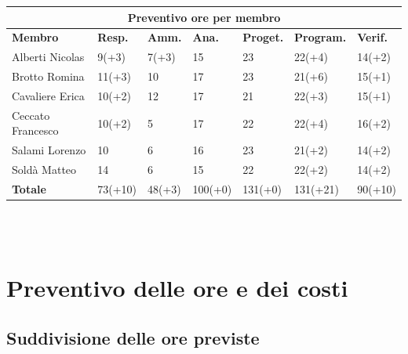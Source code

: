 \documentclass[a4paper, 12pt]{article}
\begin{document}
\begin{center}
	\begin{tabularx}{\textwidth}{|X|X|X|X|X|X|X|}
		\hline
		\multicolumn{7}{|c|}{\textbf{Preventivo ore per membro}}                                               \\
		\hline
		\hline
		\textbf{Membro}   & \textbf{Resp.}    & \textbf{Amm.}   & \textbf{Ana.} &
		\textbf{Proget.}  & \textbf{Program.} & \textbf{Verif.}                                                \\
		\hline
		Alberti Nicolas   & 9(+3)             & 7(+3)           & 15            & 23      & 22(+4)   & 14(+2)  \\
		\hline
		Brotto Romina     & 11(+3)            & 10              & 17            & 23      & 21(+6)   & 15(+1)  \\
		\hline
		Cavaliere Erica   & 10(+2)            & 12              & 17            & 21      & 22(+3)   & 15(+1)  \\
		\hline
		Ceccato Francesco & 10(+2)            & 5               & 17            & 22      & 22(+4)   & 16(+2)  \\
		\hline
		Salami Lorenzo    & 10                & 6               & 16            & 23      & 21(+2)   & 14(+2)  \\
		\hline
		Soldà Matteo      & 14                & 6               & 15            & 22      & 22(+2)   & 14(+2)  \\
		\hline
		\hline
		\textbf{Totale}   & 73(+10)           & 48(+3)          & 100(+0)       & 131(+0) & 131(+21) & 90(+10) \\
		\hline
	\end{tabularx}\\[8pt]
	\mbox{}\\
\end{center}

\newpage

\section{Preventivo delle ore e dei costi}

\subsection{Suddivisione delle ore previste}
\end{document}
